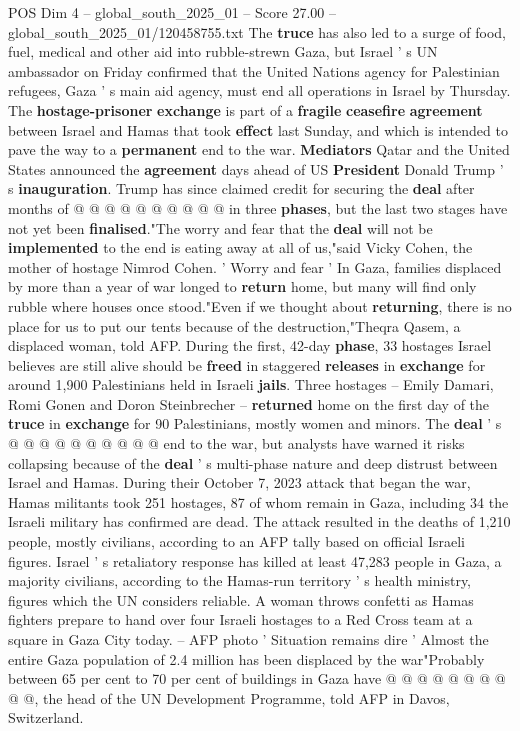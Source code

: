 \begin{textsample}{POS Dim 4 – global\_south\_2025\_01 – Score 27.00 – global\_south\_2025\_01/120458755.txt}
The \textbf{truce} has also led to a surge of food, fuel, medical and other aid into rubble-strewn Gaza, but Israel ' s UN ambassador on Friday confirmed that the United Nations agency for Palestinian refugees, Gaza ' s main aid agency, must end all operations in Israel by Thursday.
The \textbf{hostage-prisoner} \textbf{exchange} is part of a \textbf{fragile} \textbf{ceasefire} \textbf{agreement} between Israel and Hamas that took \textbf{effect} last Sunday, and which is intended to pave the way to a \textbf{permanent} end to the war. \textbf{Mediators} Qatar and the United States announced the \textbf{agreement} days ahead of US \textbf{President} Donald Trump ' s \textbf{inauguration}.
Trump has since claimed credit for securing the \textbf{deal} after months of @ @ @ @ @ @ @ @ @ @ in three \textbf{phases}, but the last two stages have not yet been \textbf{finalised}."The worry and fear that the \textbf{deal} will not be \textbf{implemented} to the end is eating away at all of us,"said Vicky Cohen, the mother of hostage Nimrod Cohen. ' Worry and fear ' In Gaza, families displaced by more than a year of war longed to \textbf{return} home, but many will find only rubble where houses once stood."Even if we thought about \textbf{returning}, there is no place for us to put our tents because of the destruction,"Theqra Qasem, a displaced woman, told AFP.
During the first, 42-day \textbf{phase}, 33 hostages Israel believes are still alive should be \textbf{freed} in staggered \textbf{releases} in \textbf{exchange} for around 1,900 Palestinians held in Israeli \textbf{jails}.
Three hostages -- Emily Damari, Romi Gonen and Doron Steinbrecher -- \textbf{returned} home on the first day of the \textbf{truce} in \textbf{exchange} for 90 Palestinians, mostly women and minors.
The \textbf{deal} ' s @ @ @ @ @ @ @ @ @ @ end to the war, but analysts have warned it risks collapsing because of the \textbf{deal} ' s multi-phase nature and deep distrust between Israel and Hamas.
During their October 7, 2023 attack that began the war, Hamas militants took 251 hostages, 87 of whom remain in Gaza, including 34 the Israeli military has confirmed are dead.
The attack resulted in the deaths of 1,210 people, mostly civilians, according to an AFP tally based on official Israeli figures.
Israel ' s retaliatory response has killed at least 47,283 people in Gaza, a majority civilians, according to the Hamas-run territory ' s health ministry, figures which the UN considers reliable.
A woman throws confetti as Hamas fighters prepare to hand over four Israeli hostages to a Red Cross team at a square in Gaza City today. -- AFP photo ' Situation remains dire ' Almost the entire Gaza population of 2.4 million has been displaced by the war"Probably between 65 per cent to 70 per cent of buildings in Gaza have @ @ @ @ @ @ @ @ @ @, the head of the UN Development Programme, told AFP in Davos, Switzerland.

\end{textsample}
